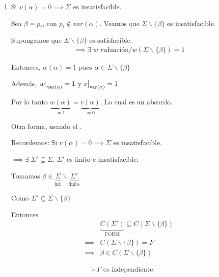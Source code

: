 \begin{itemize}
\begin{enumerate}
\begin{enumerate}
                    \item Si $v(\alpha) = 0 \implies \Sigma$ es 
                        insatisfacible.

                        Sea $\beta = p_i$, con $p_i \notin var(\alpha)$.
                        Veamos que $\Sigma \backslash \{ \beta \}$ es
                        insatisfacible.

                        Supongamos que $\Sigma \backslash \{ \beta \}$ es
                        satisfacible.
                        \begin{gather*}
                            \implies \exists \; w \text{ valuación} /
                            w(\Sigma \backslash \{\beta\}) = 1
                        \end{gather*}

                        Entonces, $w(\alpha) = 1$ pues
                        $\alpha \in \Sigma \backslash \{ \beta \}$

                        Además, $\frest{w}{\mathrm{var}(\alpha)} = 1$ y
                        $\frest{v}{\mathrm{var}(\alpha)} = 1$

                        Por lo tanto $\underbrace{w(\alpha)}_{=1} 
                            = \underbrace{v(\alpha)}_{= 0}$.
                        Lo cual es un absurdo.

                        \bigskip
                        Otra forma, usando el .

                        Recordemos: Si $v(\alpha) = 0 \implies \Sigma$ es 
                        insatisfacible.

                        $\implies \exists \; \Sigma' \subseteq \Sigma$, 
                        $\Sigma'$ es finito e insatisfacible.

                        Tomamos $\beta \in \underbrace{\Sigma}_{\text{inf.}} 
                        \backslash \underbrace{\Sigma'}_{\text{finito}}$

                        Como $\Sigma' \subseteq \Sigma \backslash \{\beta\}$

                        Entonces
                        \begin{align*}
                            & \underbrace{C(\Sigma')}_{\mathrm{FORM}} 
                            \subseteq C(\Sigma \backslash \{\beta\}) \\
                            \implies & C(\Sigma \backslash \{ \beta \}) = F \\
                            \implies & \beta \in 
                            C(\Sigma\backslash \{ \beta \})
                        \end{align*}
                \end{enumerate}

                \begin{gather*}
                    \therefore ~ \Gamma \text{ es independiente.}
                \end{gather*}
        \end{enumerate}
\end{itemize}

